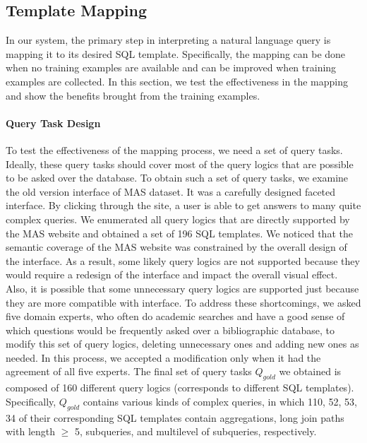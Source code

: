 \documentclass{vldb}
\begin{document}
\subsection{Template Mapping}
\label{subsec:disambiguationTemplate}
In our system, the primary step in interpreting a natural language query is mapping it to its desired SQL template.  Specifically, the mapping can be done when no training examples are available and can be improved when training examples are collected.  In this section, we test the effectiveness in the mapping and show the benefits brought from the training examples.  

\paragraph*{Query Task Design}
To test the effectiveness of the mapping process, we need a set of query tasks.  Ideally, these query tasks should cover most of the query logics that are possible to be asked over the database.  To obtain such a set of query tasks, we examine the old version interface of MAS dataset.  It was a carefully designed faceted interface.  By clicking through the site, a user is able to get answers to many quite complex queries.  We enumerated all query logics that are directly supported by the MAS website and obtained a set of 196 SQL templates.  We noticed that the semantic coverage of the MAS website was constrained by the overall design of the interface. As a result, some likely query logics are not supported because they would require a redesign of the interface and impact the overall visual effect. Also, it is possible that some unnecessary query logics are supported just because they are more compatible with interface.  To address these shortcomings, we asked five domain experts, who often do academic searches and have a good sense of which questions would be frequently asked over a bibliographic database, to modify this set of query logics, deleting unnecessary ones and adding new ones as needed.  In this process, we accepted a modification only when it had the agreement of all five experts.  The final set of query tasks $Q_{gold}$ we obtained is composed of 160 different query logics (corresponds to different SQL templates).  Specifically, $Q_{gold}$ contains various kinds of complex queries, in which 110, 52, 53, 34 of their corresponding SQL templates contain aggregations, long join paths with length $\geq$ 5, subqueries, and multilevel of subqueries, respectively.  
\end{document}
